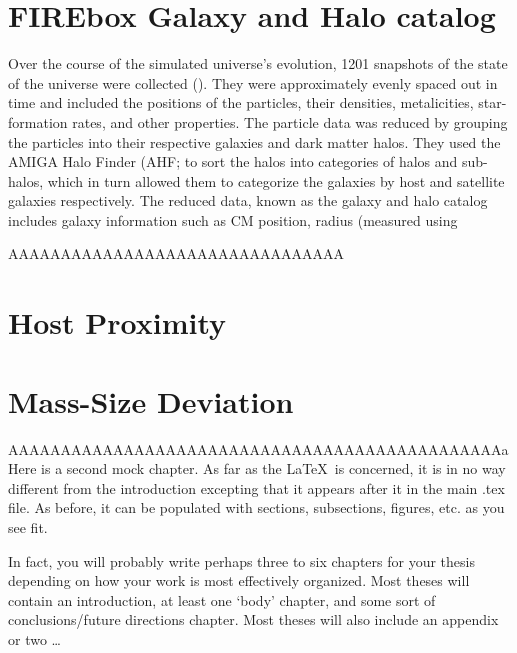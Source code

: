 
\section{FIREbox Galaxy and Halo catalog}
Over the course of the simulated universe's evolution, 1201 snapshots of the state of the universe were collected (\cite{feldmannFIREboxSimulatingGalaxies2022}). They were approximately evenly spaced out in time and included the positions of the particles, their densities, metalicities, star-formation rates, and other properties. The particle data was reduced by grouping the particles into their respective galaxies and dark matter halos. They used the AMIGA Halo Finder (AHF; \cite{knollmannAhfAMIGAHALO2009} to sort the halos into categories of halos and sub-halos, which in turn allowed them to categorize the galaxies by host and satellite galaxies respectively. The reduced data, known as the galaxy and halo catalog includes galaxy information such as CM position, radius (measured using 

AAAAAAAAAAAAAAAAAAAAAAAAAAAAAAAA

\section{Host Proximity}

\section{Mass-Size Deviation}







AAAAAAAAAAAAAAAAAAAAAAAAAAAAAAAAAAAAAAAAAAAAAAAa
Here is a second mock chapter.  As far as the \LaTeX ~is concerned, it is in no way different from the introduction excepting that it appears after it in the main .tex file.  As before, it can be populated with sections, subsections, figures, etc. as you see fit.

In fact, you will probably write perhaps three to six chapters for your thesis depending on how your work is most effectively organized.  Most theses will contain an introduction, at least one `body' chapter, and some sort of conclusions/future directions chapter.  Most theses will also include an appendix or two \ldots